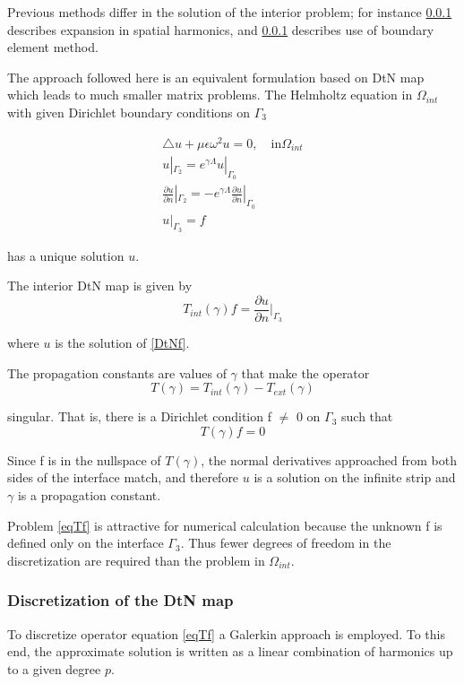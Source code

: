 Previous methods differ in the solution of the interior problem; for
instance \ref{} describes expansion in spatial harmonics, and \ref{}
describes use of boundary element method.

The approach followed here is an equivalent formulation based on DtN
map which leads to much smaller matrix problems. The Helmholtz
equation in $\Omega_{int}$ with given Dirichlet boundary conditions on
$\Gamma_3$

\begin{equation}
\begin{array}{ll}
\triangle u + \mu \epsilon \omega^2 u = 0, \quad \textrm{in}
\Omega_{int} \\
u|_{\Gamma_2} = e^{\gamma \Lambda} u|_{\Gamma_0} \\
\frac{\partial u}{\partial n} |_{\Gamma_2} = -e^{\gamma \Lambda}
 \frac{\partial u}{\partial n} |_{\Gamma_0} \\
u|_{\Gamma_3} = f
\end{array}
\label{DtNf}
\end{equation} 

has a unique solution $u$.

The interior DtN map is given by
\begin{equation}
  T_{int}(\gamma) f = \frac{\partial u}{\partial n} |_{\Gamma_3}
\end{equation} 

where $u$ is the solution of \ref{DtNf}.

The propagation constants are values of $\gamma$ that make the operator
\begin{equation}
T(\gamma) = T_{int}(\gamma) - T_{ext}(\gamma)
\end{equation} 

singular. That is, there is a Dirichlet condition f $\neq$ 0 on
$\Gamma_3$ such that
\begin{equation}
T(\gamma) f = 0
\label{eqTf}
\end{equation}

Since f is in the nullspace of $T(\gamma)$, the normal derivatives
approached from both sides of the interface match, and therefore $u$
is a solution on the infinite strip and $\gamma$ is a propagation
constant.

Problem \ref{eqTf} is attractive for numerical calculation because the
unknown f is defined only on the interface $\Gamma_3$. Thus fewer
degrees of freedom in the discretization are required than the problem
in $\Omega_{int}$.

\subsubsection{Discretization of the DtN map}
To discretize operator equation \ref{eqTf} a Galerkin approach is employed. To this end, the approximate solution is written as a linear combination of harmonics up to a given degree $p$.